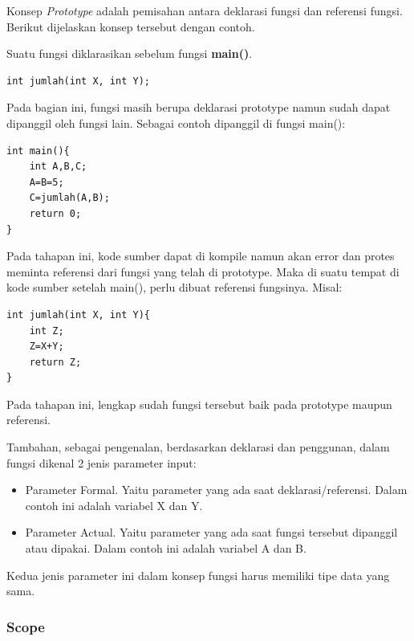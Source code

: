 \documentclass[12pt,]{article}
\begin{document}
	Konsep \textit{Prototype} adalah pemisahan antara deklarasi fungsi dan referensi fungsi.
	Berikut dijelaskan konsep tersebut dengan contoh.

	Suatu fungsi diklarasikan sebelum fungsi \textbf{main()}.
	\begin{verbatim}
int jumlah(int X, int Y);
	\end{verbatim}

	Pada bagian ini, fungsi masih berupa deklarasi prototype namun sudah dapat dipanggil oleh fungsi lain.
	Sebagai contoh dipanggil di fungsi main():
	\begin{verbatim}
int main(){
	int A,B,C;
	A=B=5;
	C=jumlah(A,B);
	return 0;
}
	\end{verbatim}

	Pada tahapan ini, kode sumber dapat di kompile namun akan error dan protes meminta referensi dari fungsi yang telah di prototype.
	Maka di suatu tempat di kode sumber setelah main(), perlu dibuat referensi fungsinya.
	Misal:
	\begin{verbatim}
int jumlah(int X, int Y){
	int Z;
	Z=X+Y;
	return Z;
}
	\end{verbatim}

	Pada tahapan ini, lengkap sudah fungsi tersebut baik pada prototype maupun referensi.

	Tambahan, sebagai pengenalan, berdasarkan deklarasi dan penggunan, dalam fungsi dikenal 2 jenis parameter input:
	\begin{itemize}
		\item Parameter Formal. Yaitu parameter yang ada saat deklarasi/referensi.
		Dalam contoh ini adalah variabel X dan Y.

		\item Parameter Actual. Yaitu parameter yang ada saat fungsi tersebut dipanggil atau dipakai.
		Dalam contoh ini adalah variabel A dan B.
	\end{itemize}

	Kedua jenis parameter ini dalam konsep fungsi harus memiliki tipe data yang sama.

	\subsubsection{Scope}
\end{document}
